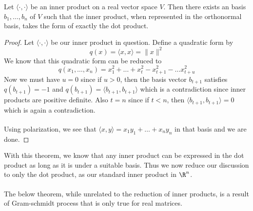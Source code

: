 \begin{thm}{}{} Let $\langle \cdot,\cdot\rangle$ be an inner product on a real vector space $V$. Then there exists an basis $b_1,\dots,b_n$ of $V$ such that the inner product, when represented in the orthonormal basis, takes the form of exactly the dot product. \tcbline
\begin{proof}
Let $\langle \cdot,\cdot\rangle$ be our inner product in question. Define a quadratic form by $$q(x)=\langle x,x\rangle=\|x\|^2$$ We know that this quadratic form can be reduced to $$q(x_1,\dots,x_n)=x_1^2+\dots+x_t^2-x_{t+1}^2-\dots x_{t+u}^2$$ Now we must have $u=0$ since if $u>0$, then the basis vector $b_{t+1}$ satisfies $q(b_{t+1})=-1$ and $q(b_{t+1})=\langle b_{t+1},b_{t+1}\rangle$ which is a contradiction since inner products are positive definite. Also $t=n$ since if $t<n$, then $\langle b_{t+1},b_{t+1}\rangle=0$ which is again a contradiction. \\~\\
Using polarization, we see that $\langle x,y\rangle=x_1y_1+\dots+x_ny_n$ in that basis and we are done. 
\end{proof}
\end{thm}

With this theorem, we know that any inner product can be expressed in the dot product as long as it is under a suitable basis. Thus we now reduce our discussion to only the dot product, as our standard inner product in $\R^n$. \\~\\
The below theorem, while unrelated to the reduction of inner products, is a result of Gram-schmidt process that is only true for real matrices. 

